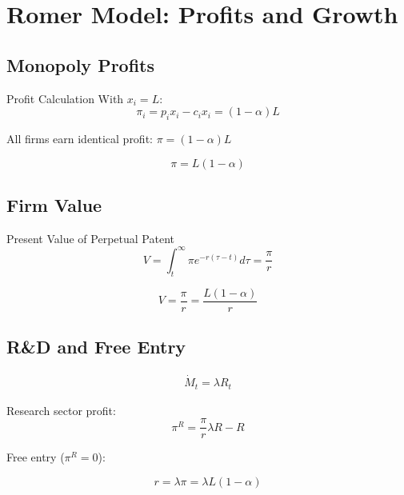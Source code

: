 \documentclass[a4paper,11pt]{article}
\begin{document}
\clearpage

\section{Romer Model: Profits and Growth}

\subsection*{Monopoly Profits}
\begin{derivationbox}{Profit Calculation}
With $x_i = L$:
\[
\pi_i = p_i x_i - c_i x_i = (1 - \alpha)L
\]

All firms earn identical profit: $\pi = (1-\alpha)L$
\end{derivationbox}

\begin{resultbox}
\[
\boxed{\pi = L(1-\alpha)}
\tag{Monopoly Profits}
\]
\end{resultbox}

\medskip
\subsection*{Firm Value}
\begin{derivationbox}{Present Value of Perpetual Patent}
\[
V = \int_t^\infty \pi e^{-r(\tau-t)} d\tau = \frac{\pi}{r}
\tag{Firm Value}
\]
\end{derivationbox}

\begin{resultbox}
\[
\boxed{V = \frac{\pi}{r} = \frac{L(1-\alpha)}{r}}
\tag{Value}
\]
\end{resultbox}

\subsection*{R\&D and Free Entry}
\begin{align*}
\dot{M}_t = \lambda R_t \tag{R\&D Technology}
\end{align*}

Research sector profit:
\[
\pi^R = \frac{\pi}{r} \lambda R - R
\]

Free entry ($\pi^R = 0$):
\begin{resultbox}
\[
\boxed{r = \lambda \pi = \lambda L (1-\alpha)}
\tag{Equilibrium Interest Rate}
\]
\end{resultbox}
\end{document}
